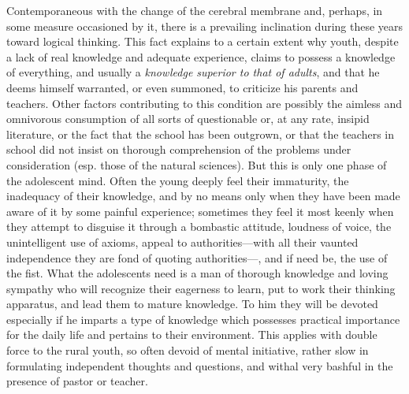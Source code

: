 Contemporaneous with the change of the cerebral membrane and, perhaps, in some measure occasioned by it, there is a prevailing inclination during these years toward logical thinking. This fact explains to a certain extent why youth, despite a lack of real knowledge and adequate experience, claims to possess a knowledge of everything, and usually a \emph{knowledge superior to that of adults}, and that he deems himself warranted, or even summoned, to criticize his parents and teachers. Other factors contributing to this condition are possibly the aimless and omnivorous consumption of all sorts of questionable or, at any rate, insipid literature, or the fact that the school has been outgrown, or that the teachers in school did not insist on thorough comprehension of the problems under consideration (esp. those of the natural sciences). But this is only one phase of the adolescent mind. Often the young deeply feel their immaturity, the inadequacy of their knowledge, and by no means only when they have been made aware of it by some painful experience; sometimes they feel it most keenly when they attempt to disguise it through a bombastic attitude, loudness of voice, the unintelligent use of axioms, appeal to authorities—with all their
vaunted independence they are fond of quoting authorities—, and if need be, the use of the fist. What the adolescents need is a man of thorough knowledge and loving sympathy who will recognize their eagerness to learn, put to work their thinking apparatus, and lead them to mature knowledge. To him they will be devoted especially if he imparts a type of knowledge which possesses practical importance for the daily life and pertains to their environment. This applies with double force to the rural youth, so often devoid of mental initiative, rather slow in formulating independent thoughts and questions, and withal very bashful in the presence of pastor or teacher.


